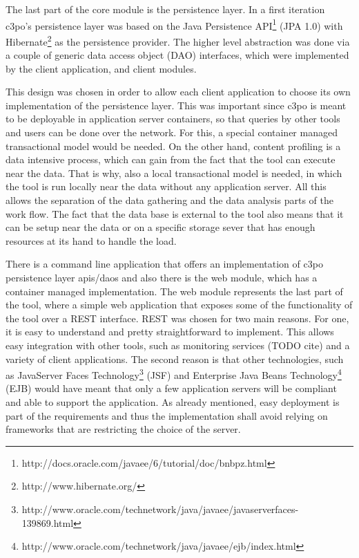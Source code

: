 
The last part of the core module is the persistence layer.
In a first iteration c3po's persistence layer was based on the Java Persistence API\footnote{http://docs.oracle.com/javaee/6/tutorial/doc/bnbpz.html} (JPA 1.0) with Hibernate\footnote{http://www.hibernate.org/} as the persistence provider. The higher level abstraction was done via a couple of generic data access object (DAO) interfaces, which were implemented by the client application, and client modules.

This design was chosen in order to allow each client application to choose its own implementation of the persistence layer. This was important since c3po is meant to be deployable in application server containers, so that queries by other tools and users can be done over the network. For this, a special container managed transactional model would be needed. On the other hand, content profiling is a data intensive process, which can gain from the fact that the tool can execute near the data. That is why, also a local transactional model is needed, in which the tool is run locally near the data without any application server. All this allows the separation of the data gathering and the data analysis parts of the work flow. The fact that the data base is external to the tool also means that it can be setup near the data or on a specific storage sever that has enough resources at its hand to handle the load.

There is a command line application that offers an implementation of c3po persistence layer apis/daos and also there is the web module, which has a container managed implementation. The web module represents the last part of the tool, where a simple web application that exposes some of the functionality of the tool over a REST \cite{Fielding:2000:ASD:932295} interface. REST was chosen for two main reasons. For one, it is easy to understand and pretty straightforward to implement. This allows easy integration with other tools, such as monitoring services (TODO cite) and a variety of client applications. The second reason is that other technologies, such as JavaServer Faces Technology\footnote{http://www.oracle.com/technetwork/java/javaee/javaserverfaces-139869.html} (JSF) and Enterprise Java Beans Technology\footnote{http://www.oracle.com/technetwork/java/javaee/ejb/index.html} (EJB) would have meant that only a few application servers will be compliant and able to support the application. As already mentioned, easy deployment is part of the requirements and thus the implementation shall avoid relying on frameworks that are restricting the choice of the server.

